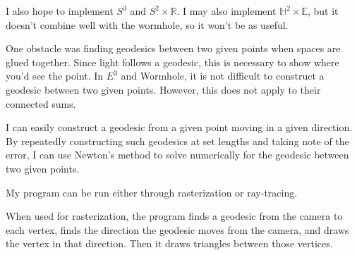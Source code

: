 {I also hope to implement $S^3$ and $S^2 \times \mathbb{R}$. I may also implement $\mathbb{H}^2 \times \mathbb{E}$, but it doesn't combine well with the wormhole, so it won't be as useful.
}

One obstacle was finding geodesics between two given points when spaces are glued together. Since light follows a geodesic, this is necessary to show where you'd see the point. In $E^3$ and Wormhole, it is not difficult to construct a geodesic between two given points. However, this does not apply to their connected sums.

I can easily construct a geodesic from a given point moving in a given direction. By repeatedly constructing such geodesics at set lengths and taking note of the error, I can use Newton's method to solve numerically for the geodesic between two given points.

My program can be run either through rasterization or ray-tracing.

When used for rasterization, the program finds a geodesic from the camera to each vertex, finds the direction the geodesic moves from the camera, and draws the vertex in that direction. Then it draws triangles between those vertices.

